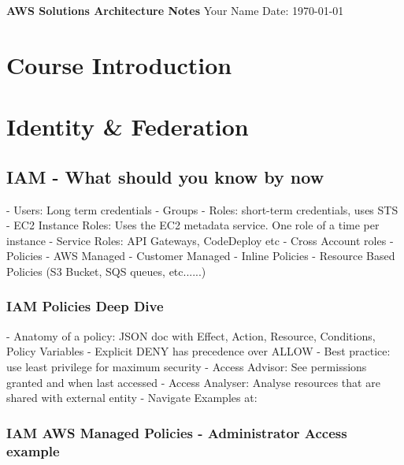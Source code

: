 \documentclass[11pt]{book}
\begin{document}
    \begin{titlepage}
        \centering
        \vspace*{2in}
        \Huge \textbf{AWS Solutions Architecture Notes}
        \vfill
        \Large Your Name
        \vfill
        \Large Date: \today
    \end{titlepage}

    \newpage

    \tableofcontents
    \newpage


    \chapter{Course Introduction}


    \chapter{Identity \& Federation}


    \section{IAM - What should you know by now}
    - Users: Long term credentials
    - Groups
    - Roles: short-term credentials, uses STS
    - EC2 Instance Roles: Uses the EC2 metadata service. One role of a time per instance
    - Service Roles: API Gateways, CodeDeploy etc
    - Cross Account roles
    - Policies
    - AWS Managed
    - Customer Managed
    - Inline Policies
    - Resource Based Policies (S3 Bucket, SQS queues, etc......)

    \subsection{IAM Policies Deep Dive}
    - Anatomy of a policy: JSON doc with Effect, Action, Resource, Conditions, Policy Variables
    - Explicit DENY has precedence over ALLOW
    - Best practice: use least privilege for maximum security
    - Access Advisor: See permissions granted and when last accessed
    - Access Analyser: Analyse resources that are shared with external entity
    - Navigate Examples at: %

    \subsection{IAM AWS Managed Policies - Administrator Access example}
\end{document}
